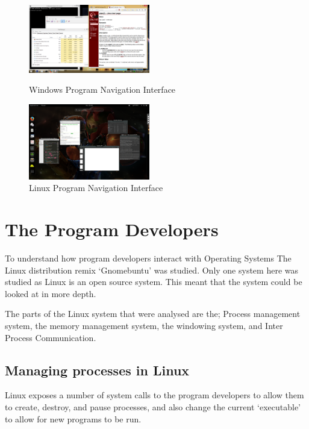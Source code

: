 \documentclass[a4paper]{report}
\begin{document}
\begin{figure}[ht]
\centering
\begin{minipage}{.5\textwidth}
  \centering
  \includegraphics[width=200px]{images/Windows_Window_Navigation_Screenshot}
  \caption{Windows Program Navigation Interface}
  \label{fig:WinWinNavScreen}
\end{minipage}%
\begin{minipage}{.5\textwidth}
  \centering
  \includegraphics[width=200px]{images/Linux_Window_Navigation_Screenshot}
  \caption{Linux Program Navigation Interface}
  \label{fig:LinWinNavScreen}
\end{minipage}
\end{figure}


\clearpage
\section{The Program Developers}

To understand how program developers interact with Operating Systems The Linux distribution remix `Gnomebuntu' was studied. Only one system here was studied as Linux is an open source system. This meant that the system could be looked at in more depth.

The parts of the Linux system that were analysed are the; Process management system, the memory management system, the windowing system, and Inter Process Communication.

\subsection{Managing processes in Linux}

Linux exposes a number of system calls to the program developers to allow them to create, destroy, and pause processes, and also change the current `executable' to allow for new programs to be run.
\end{document}
